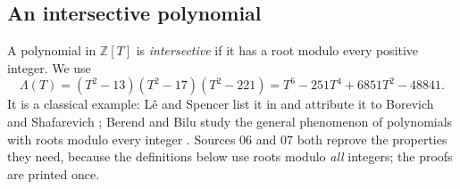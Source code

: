 \documentclass[11pt,oneside]{article}
\numberwithin{equation}{section}
\theoremstyle{definition}
\theoremstyle{remark}
\newcommand{\Z}{\mathbb Z}
\begin{document}
\subsection{An intersective polynomial}

A polynomial in $\Z[T]$ is \emph{intersective} if it has a root modulo every
positive integer. We use
\begin{equation}\label{odg:def:eq:Lambda}
 \Lambda(T)=(T^2-13)(T^2-17)(T^2-221)=T^6-251T^4+6851T^2-48841 .
\end{equation}
It is a classical example: L\^e and Spencer list it in \cite[Section 2,
Example 4]{LeSpencer} and attribute it to Borevich and Shafarevich
\cite[p.~3]{BorevichShafarevich}; Berend and Bilu study the general phenomenon
of polynomials with roots modulo every integer \cite{BerendBilu}. Sources 06
and 07 both reprove the properties they need, because the definitions below
use roots modulo \emph{all} integers; the proofs are printed once.
\end{document}
